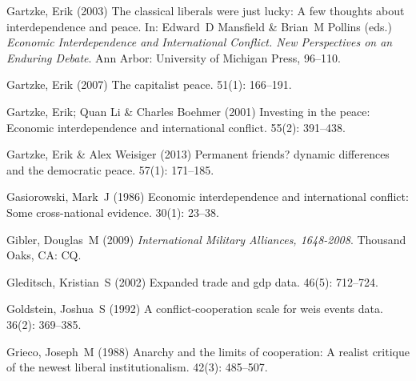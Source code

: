 \documentclass[12pt]{article}
\theoremstyle{hypothesis}
\begin{document}
\begin{thebibliography}{}
Gartzke, Erik (2003) The classical liberals were just lucky: A few thoughts
  about interdependence and peace.
\newblock In: Edward~D Mansfield \& Brian~M Pollins (eds.) {\em Economic
  Interdependence and International Conflict. New Perspectives on an Enduring
  Debate}. Ann Arbor: University of Michigan Press,  96--110.

Gartzke, Erik (2007) The capitalist peace.
 { 51\/}(1): 166--191.

Gartzke, Erik; Quan Li  \& Charles Boehmer (2001) Investing in the peace:
  Economic interdependence and international conflict.
 { 55\/}(2): 391--438.

Gartzke, Erik  \& Alex Weisiger (2013) Permanent friends? dynamic differences
  and the democratic peace.
 { 57\/}(1): 171--185.

Gasiorowski, Mark~J (1986) Economic interdependence and international conflict:
  Some cross-national evidence.
 { 30\/}(1): 23--38.

Gibler, Douglas~M (2009) {\em International Military Alliances, 1648-2008}.
\newblock Thousand Oaks, CA: CQ.

Gleditsch, Kristian~S (2002) Expanded trade and gdp data.
 { 46\/}(5): 712--724.

Goldstein, Joshua~S (1992) A conflict-cooperation scale for weis events data.
 { 36\/}(2): 369--385.

Grieco, Joseph~M (1988) Anarchy and the limits of cooperation: A realist
  critique of the newest liberal institutionalism.
 { 42\/}(3): 485--507.


\end{thebibliography}
\end{document}
